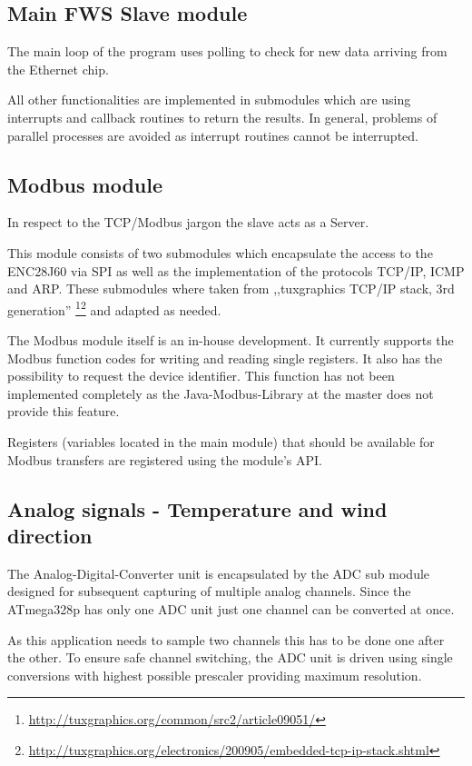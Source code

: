\subsection{Main FWS Slave module}
The main loop of the program uses polling to check for new data arriving from the Ethernet chip.

All other functionalities are implemented in submodules which are using interrupts and callback routines to return the results. In general, problems of parallel processes are avoided as interrupt routines cannot be interrupted.

\subsection{Modbus module}
In respect to the TCP/Modbus jargon the slave acts as a Server.

This module consists of two submodules which encapsulate the access to the ENC28J60 via SPI as well as the implementation of the protocols TCP/IP, ICMP and ARP. These submodules where taken from ,,tuxgraphics TCP/IP stack, 3rd generation'' \footnote{\url{http://tuxgraphics.org/common/src2/article09051/}}\footnote{\url{http://tuxgraphics.org/electronics/200905/embedded-tcp-ip-stack.shtml}} and adapted as needed.

The Modbus module itself is an in-house development. It currently supports the Modbus function codes for writing and reading single registers. It also has the possibility to request the device identifier. This function has not been implemented completely as the Java-Modbus-Library at the master does not provide this feature.

Registers (variables located in the main module) that should be available for Modbus transfers are registered using the module's API.

\subsection{Analog signals - Temperature and wind direction}
The Analog-Digital-Converter unit is encapsulated by the ADC sub module designed for subsequent capturing of multiple analog channels.
Since the ATmega328p has only one ADC unit just one channel can be converted at once.

As this application needs to sample two channels this has to be done one after the other. To ensure safe channel switching, the ADC unit is driven using single conversions with highest possible prescaler providing maximum resolution.

